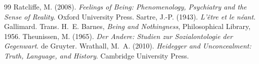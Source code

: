 \documentclass{situationist-preprint}
\begin{document}
\begin{thebibliography}{99}
 Ratcliffe, M. (2008). \emph{Feelings of Being: Phenomenology, Psychiatry and the Sense of Reality}. Oxford University Press.
 Sartre, J.-P. (1943). \emph{L'\^etre et le n\'eant}. Gallimard. Trans. H.~E. Barnes, \emph{Being and Nothingness}, Philosophical Library, 1956.
 Theunissen, M. (1965). \emph{Der Andere: Studien zur Sozialontologie der Gegenwart}. de Gruyter.
 Wrathall, M.~A. (2010). \emph{Heidegger and Unconcealment: Truth, Language, and History}. Cambridge University Press.
\end{thebibliography}
\end{document}
